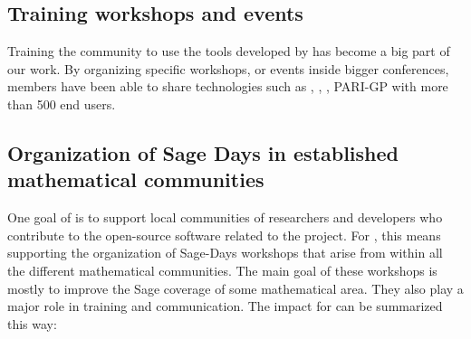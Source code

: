 \documentclass{deliverablereport}
\begin{document}
\subsection{Training workshops and events}

Training the community to use the tools developed by \ODK has become a big 
part of our work. By organizing specific workshops, or events inside bigger
conferences, \ODK members have been able to share \ODK technologies such as \Jupyter,
\Sage, \GAP, PARI-GP with more than 500 end users.





























\subsection{Organization of Sage Days in established mathematical communities}

One goal of \ODK is to support local communities of researchers
and developers who contribute to the open-source software related to
the project. For \Sage, this means supporting the organization of Sage-Days
workshops that arise from within all the different mathematical communities. The main 
goal of these workshops is mostly to improve the Sage coverage of some mathematical
area. They also play a major role in training and communication. The
impact for \ODK can be summarized this way:
\end{document}
